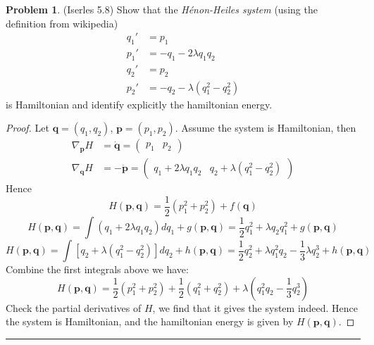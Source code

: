 \documentclass[a4paper, 10pt]{article}
\theoremstyle{definition}
\newtheorem{problem}{Problem}
\theoremstyle{hSol}
\begin{document}
\begin{problem} (Iserles 5.8) Show that the \emph{H\'enon-Heiles system} (using the definition from wikipedia)
\begin{equation}
  \begin{split}
    q_1' &= p_1 \\
    p_1' &= -q_1 - 2 \lambda q_1 q_2\\
    q_2' &= p_2 \\
    p_2' &= -q_2 - \lambda (q_1^2 - q_2^2)
  \end{split}
\end{equation}
is Hamiltonian and identify explicitly the hamiltonian energy.
\end{problem}
\begin{proof} Let $\bm{q}=(q_1, q_2)$, $\bm{p}=(p_1, p_2)$. Assume the system is Hamiltonian, then 
\begin{equation}
  \begin{split}
    \nabla_{\bm{p}} H &= \dot{\bm{q}} = \begin{pmatrix}
      p_1 & p_2
    \end{pmatrix} \\
    \nabla_{\bm{q}} H &= -\dot{\bm{p}} = \begin{pmatrix}
      q_1 + 2 \lambda q_1 q_2 & q_2 + \lambda (q_1^2 - q_2^2)
    \end{pmatrix}
  \end{split}
\end{equation}
Hence
$$
H(\bm{p}, \bm{q}) = \frac{1}{2}(p_1^2 + p_2^2) + f(\bm{q})
$$
$$
  H(\bm{p}, \bm{q}) = \int (q_1 + 2 \lambda q_1 q_2) dq_1 + g(\bm{p}, \bm{q}) = \frac{1}{2}q_1^2 + \lambda q_2 q_1^2 + g(\bm{p}, \bm{q})
$$
$$
    H(\bm{p}, \bm{q}) = \int [q_2 + \lambda (q_1^2 - q_2^2)] dq_2 + h(\bm{p}, \bm{q}) = \frac{1}{2}q_2^2 + \lambda q_1^2 q_2 - \frac{1}{3}\lambda q_2^3 + h(\bm{p}, \bm{q})
$$
Combine the first integrals above we have:
$$
  H(\bm{p}, \bm{q}) = \frac{1}{2}(p_1^2 + p_2^2) + \frac{1}{2}(q_1^2 + q_2^2) + \lambda\left(q_1^2 q_2 - \frac{1}{3}q_2^3\right)
$$
Check the partial derivatives of $H$, we find that it gives the system indeed. Hence the system is Hamiltonian, and the hamiltonian energy is given by $H(\bm{p}, \bm{q})$.


\end{proof} 
\noindent\rule{16cm}{0.4pt}
\end{document}

